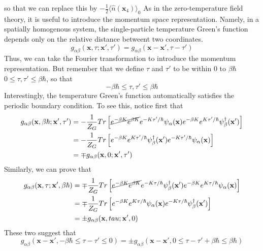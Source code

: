 so that we can replace this by $-\frac{1}{2}\langle\hat{n}(\mathbf{x}_4)\rangle_0$
As in the zero-temperature field theory, it is useful to introduce the momentum space representation.
Namely, in a spatially homogenous system, the single-particle temperature Green's function depends only on the relative distance betweent two coordinates.
\begin{equation}
g_{\alpha\beta}(\mathbf{x},\tau;\mathbf{x}',\tau')=g_{\alpha\beta}(\mathbf{x}-\mathbf{x}',\tau-\tau')
\end{equation}
Thus, we can take the Fourier transformation to introduce the momentum representation.
But remember that we define $\tau$ and $\tau'$ to be within $0$ to $\beta\hbar$ $0\leq\tau,\tau'\leq\beta\hbar$, so that
\begin{equation}
-\beta\hbar\leq\tau,\tau'\leq\beta\hbar
\end{equation}
Interestingly, the temperature Green's function automatically satisfies the periodic boundary condition.
To see this, notice first that
\begin{equation}
\begin{aligned}
g_{\alpha\beta}(\mathbf{x},\beta\hbar;\mathbf{x}',\tau')&=-\frac{1}{Z_G}Tr\left[\cancel{e^{-\beta K} e^{\beta K}} e^{-K\tau'/\hbar}\psi_\alpha(\mathbf{x})e^{-\beta K} e^{K \tau'/\hbar} \psi_\beta^\dagger(\mathbf{x}')\right]\\
&=-\frac{1}{Z_G} Tr\left[e^{-\beta K} e^{K \tau'/\hbar} \psi_\beta^\dagger(\mathbf{x}')e^{-K \tau'/\hbar}\psi_\alpha(\mathbf{x})\right]\\
&=\mp g_{\alpha\beta} (\mathbf{x},0;\mathbf{x}',\tau')
\end{aligned}
\end{equation}
Similarly, we can prove that
\begin{equation}
\begin{aligned}
g_{\alpha\beta}(\mathbf{x},\tau;\mathbf{x}',\beta\hbar)&=\mp \frac{1}{Z_G} Tr\left[\cancel{e^{-\beta K} e^{\beta K}} e^{-K\tau/\hbar}\psi^\dagger_\beta(\mathbf{x}')e^{-\beta K} e^{K \tau/\hbar} \psi_\alpha (\mathbf{x})\right]\\
&=\mp\frac{1}{Z_G}Tr\left[e^{-\beta K} e^{K\tau/\hbar}\psi_\alpha(\mathbf{x}) e^{-K\tau/\hbar} \psi_\beta^\dagger(\mathbf{x}')\right]\\
&=\pm g_{\alpha\beta}(\mathbf{x},tau;\mathbf{x}',0)
\end{aligned}
\end{equation}
These two suggest that
\begin{equation}
g_{\alpha\beta}(\mathbf{x}-\mathbf{x}',-\beta\hbar\le\tau-\tau'\le0)=\pm g_{\alpha\beta}(\mathbf{x}-\mathbf{x}',0\le\tau-\tau'+\beta\hbar\le\beta\hbar)
\end{equation}
